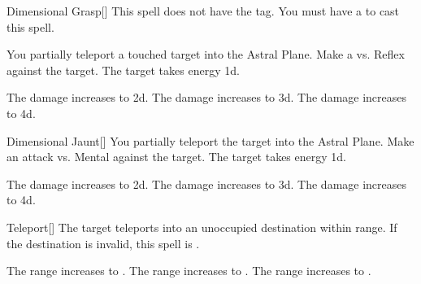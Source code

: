 \lowercase{\hypertarget{spell:Dimensional Grasp}{}}\label{spell:Dimensional Grasp}
\begin{freeability}[Rank 1]{\hypertarget{spell:Dimensional Grasp}{Dimensional Grasp}}[]
This spell does not have the  tag.
You must have a  to cast this spell.

You partially teleport a touched target into the Astral Plane.
Make a  vs. Reflex against the target.
\hit The target takes energy  \plus1d.

\rankline
{} The damage increases to  \plus2d.
 The damage increases to  \plus3d.
 The damage increases to  \plus4d.
\end{freeability}
\vspace{0.25em}



\lowercase{\hypertarget{spell:Dimensional Jaunt}{}}\label{spell:Dimensional Jaunt}
\begin{freeability}[Rank 1]{\hypertarget{spell:Dimensional Jaunt}{Dimensional Jaunt}}[]
You partially teleport the target into the Astral Plane.
Make an attack vs. Mental against the target.
\hit The target takes energy  \plus1d.

\rankline
{} The damage increases to  \plus2d.
 The damage increases to  \plus3d.
 The damage increases to  \plus4d.
\end{freeability}
\vspace{0.25em}



\lowercase{\hypertarget{spell:Teleport}{}}\label{spell:Teleport}
\begin{freeability}[Rank 1]{\hypertarget{spell:Teleport}{Teleport}}[]
The target teleports into an unoccupied destination within range.
If the destination is invalid, this spell is .

\rankline
{} The range increases to \rngmed.
 The range increases to \rnglong.
 The range increases to \rngext.
\end{freeability}
\vspace{0.25em}



